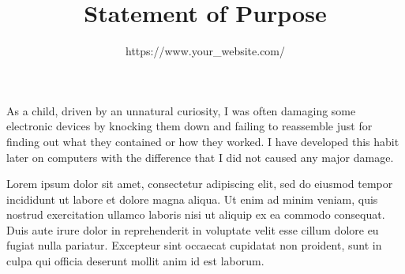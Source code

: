\documentclass[color, font]{sop}
\title{Statement of Purpose}
\author{https://www.your_website.com/}{Your Name}
\begin{document}
\maketitle


  








As a child, driven by an unnatural curiosity, I was often damaging some electronic devices by knocking them down and failing to reassemble just for finding out what they contained or how they worked. I have developed this habit later on computers with the difference that I did not caused any major damage.

Lorem ipsum dolor sit amet, consectetur adipiscing elit, sed do eiusmod tempor incididunt ut labore et dolore magna aliqua. Ut enim ad minim veniam, quis nostrud exercitation ullamco laboris nisi ut aliquip ex ea commodo consequat. Duis aute irure dolor in reprehenderit in voluptate velit esse cillum dolore eu fugiat nulla pariatur. Excepteur sint occaecat cupidatat non proident, sunt in culpa qui officia deserunt mollit anim id est laborum.
\end{document}
